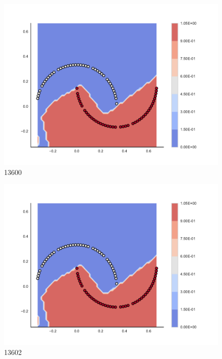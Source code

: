 \begin{subfigure}[b]{0.09\textwidth}
    \includegraphics[clip, trim=2.35cm 1.75cm 4.5cm 0cm,width=\textwidth]{img/convergence/13600.pdf}
    \caption{13600}
    \label{fig:convergence_13600}
\end{subfigure}
%
\begin{subfigure}[b]{0.09\textwidth}
    \includegraphics[clip, trim=2.35cm 1.75cm 4.5cm 0cm,width=\textwidth]{img/convergence/13602.pdf}
    \caption{13602}
    \label{fig:convergence_13602}
\end{subfigure}
%
